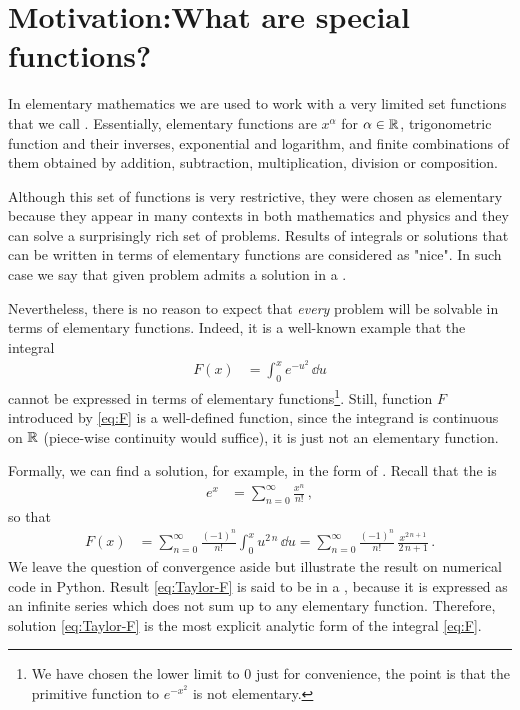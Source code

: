 \chapter{Motivation:What are special functions?}
\label{ch:motivation}


In elementary mathematics we are used to work with a very limited set functions that we call . Essentially, elementary functions are $x^\alpha$ for $\alpha\in\mathbb{R}$, trigonometric function and their inverses, exponential and logarithm, and finite combinations of them obtained by addition, subtraction, multiplication, division
or composition. 

Although this set of functions is very restrictive, they were chosen as elementary because they appear in many contexts in both mathematics and physics and they can solve a surprisingly rich set of problems. Results
of integrals or solutions that can be written in terms of elementary functions are considered as "nice". In such case we say that given problem admits a solution in a .

Nevertheless, there is no reason to expect that {\itshape every} problem will be solvable in terms of elementary functions. Indeed, it is a well-known example that the integral
\begin{align}\label{eq:F}
    F(x) &= \int_{0}^x e^{-u^2}\,\dd u
\end{align}
cannot be expressed in terms of elementary functions\footnote{We have chosen the lower limit to $0$ just for convenience, the point is that the primitive function to $e^{-x^2}$ is not elementary.}. Still, function $F$ introduced by \eqref{eq:F} is a well-defined function, since the integrand is continuous on $\mathbb{R}$ (piece-wise continuity would suffice), it is just not an elementary function. 

Formally, we can find a solution, for example, in the form of . Recall that the   is
\begin{align}\label{eq:Taylor-exp}
    e^x &= \sum_{n=0}^\infty \frac{x^n}{n!}\, ,
\end{align}
so that 
\begin{align}\label{eq:Taylor-F}
    F(x) &= \sum_{n=0}^\infty\frac{(-1)^n}{n!}\int_0^x u^{2\,n}\,\dd u =
        \sum_{n=0}^\infty\frac{(-1)^n}{n!}\,\frac{x^{2\,n+1}}{2\,n+1}\, .
\end{align}
We leave the question of convergence aside but illustrate the result on numerical code in Python. Result \eqref{eq:Taylor-F} is said to be in a , because it is expressed as an infinite series which does not sum up to any elementary function. Therefore, solution \eqref{eq:Taylor-F} is the most explicit analytic form of the integral \eqref{eq:F}. 

